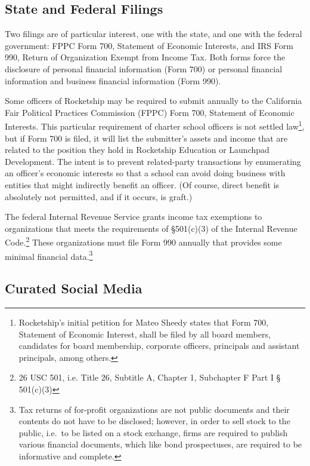 \subsection{State and Federal Filings}\label{sec:state-federal-filings}\indent

Two filings are of particular interest, one with the state, and one with the federal government: FPPC Form 700, Statement of Economic Interests, and IRS Form 990, Return of Organization Exempt from Income Tax. Both forms force the disclosure of personal financial information (Form 700) or personal financial information and business financial information (Form 990). 

Some officers of Rocketship may be required to submit annually to the California Fair Political Practices Commission (FPPC) Form 700, Statement of Economic Interests. This particular requirement of charter school officers is not settled law\footnote{Rocketship's initial petition for Mateo Sheedy states that Form 700, Statement of Economic Interest, shall be filed by all board members, candidates for board membership, corporate officers, principals and assistant principals, among others.}, but if Form 700 is filed, it will list the submitter's assets and income that are related to the position they hold in Rocketship Education or Launchpad Development. The intent is to prevent related-party transactions by enumerating an officer's economic interests so that a school can avoid doing business with entities that might indirectly benefit an officer. (Of course, direct benefit is absolutely not permitted, and if it occurs, is graft.)  

The federal Internal Revenue Service grants income tax exemptions to organizations that meets the requirements of §501(c)(3) of the  Internal Revenue Code.\footnote{26 USC 501, i.e. Title 26, Subtitle A, Chapter 1, Subchapter F Part I § 501(c)(3)} These organizations must file Form 990 annually that provides some minimal financial data.\footnote{Tax returns of for-profit organizations are not public documents and their contents do not have to be disclosed; however, in order to sell stock to the public, i.e.~to be listed on a stock exchange, firms are required to publish various financial documents, which like bond prospectuses, are required to be informative and complete.} %

\subsection{Curated Social Media}

